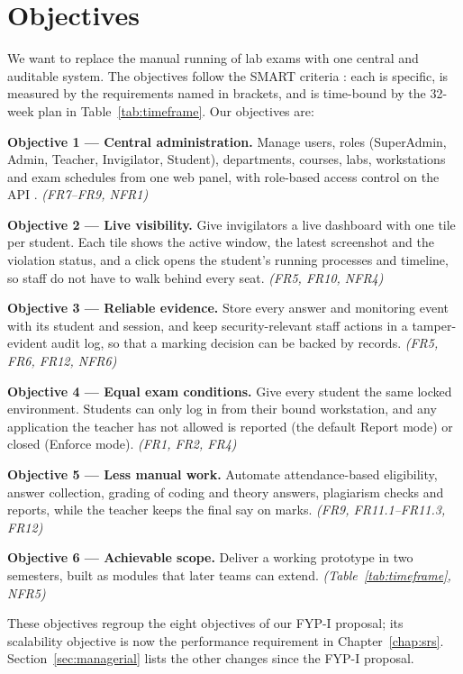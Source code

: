 \section{Objectives}

We want to replace the manual running of lab exams with one central and auditable system. The objectives follow the SMART criteria \cite{doran1981}: each is specific, is measured by the requirements named in brackets, and is time-bound by the 32-week plan in Table~\ref{tab:timeframe}. Our objectives are:

\textbf{Objective 1 --- Central administration.} Manage users, roles (SuperAdmin, Admin, Teacher, Invigilator, Student), departments, courses, labs, workstations and exam schedules from one web panel, with role-based access control on the API \cite{rbac1}. \textit{(FR7--FR9, NFR1)}

\textbf{Objective 2 --- Live visibility.} Give invigilators a live dashboard with one tile per student. Each tile shows the active window, the latest screenshot and the violation status, and a click opens the student's running processes and timeline, so staff do not have to walk behind every seat. \textit{(FR5, FR10, NFR4)}

\textbf{Objective 3 --- Reliable evidence.} Store every answer and monitoring event with its student and session, and keep security-relevant staff actions in a tamper-evident audit log, so that a marking decision can be backed by records. \textit{(FR5, FR6, FR12, NFR6)}

\textbf{Objective 4 --- Equal exam conditions.} Give every student the same locked environment. Students can only log in from their bound workstation, and any application the teacher has not allowed is reported (the default Report mode) or closed (Enforce mode). \textit{(FR1, FR2, FR4)}

\textbf{Objective 5 --- Less manual work.} Automate attendance-based eligibility, answer collection, grading of coding and theory answers, plagiarism checks and reports, while the teacher keeps the final say on marks. \textit{(FR9, FR11.1--FR11.3, FR12)}

\textbf{Objective 6 --- Achievable scope.} Deliver a working prototype in two semesters, built as modules that later teams can extend. \textit{(Table~\ref{tab:timeframe}, NFR5)}

These objectives regroup the eight objectives of our FYP-I proposal; its scalability objective is now the performance requirement in Chapter~\ref{chap:srs}. Section~\ref{sec:managerial} lists the other changes since the FYP-I proposal.
